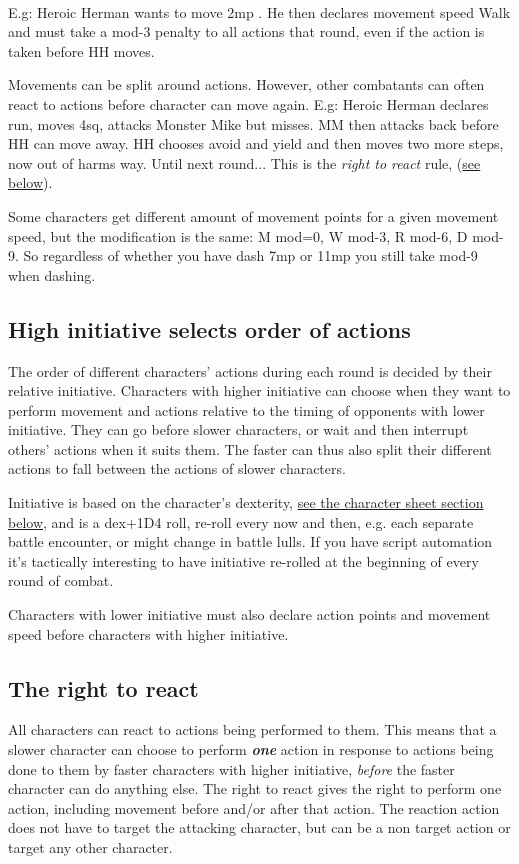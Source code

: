 \

E.g: Heroic Herman wants to move 2mp . He then declares movement speed Walk and must take a mod-3 penalty to all actions that round, even if the action is taken before HH moves.

Movements can be split around actions. However, other combatants can often react to actions before character can move again. E.g: Heroic Herman declares run, moves 4sq, attacks Monster Mike but misses. MM then attacks back before HH can move away. HH chooses avoid and yield and then moves two more steps, now out of harms way. Until next round... This is the \emph{right to react} rule, (\hyperref[righttoreact]{see below}).

Some characters get different amount of movement points for a given movement speed, but the modification is the same: M mod=0, W mod-3, R mod-6, D mod-9. So regardless of whether you have dash 7mp or 11mp you still take mod-9 when dashing.


\subsection*{High initiative selects order of actions}
The order of different characters' actions during each round is decided by their relative initiative. Characters with higher initiative can choose when they want to perform movement and actions relative to the timing of opponents with lower initiative. They can go before slower characters, or wait and then interrupt others' actions when it suits them. The faster can thus also split their different actions to fall between the actions of slower characters.

Initiative is based on the character's dexterity,
\hyperref[sec:charsheet]{see the character sheet section below},
and is a dex+1D4 roll, re-roll every now and then, e.g. each separate battle encounter, or might change in battle lulls. If you have script automation it's tactically interesting to have initiative re-rolled at the beginning of every round of combat.

Characters with lower initiative must also declare action points and movement speed before characters with higher initiative.


\subsection*{The right to react}
\label{righttoreact}
All characters can react to actions being performed to them. This means that a slower character can choose to perform \textit{\textbf{one}} action in response to actions being done to them by faster characters with higher initiative, \emph{before} the faster character can do anything else.
The right to react gives the right to perform one action, including movement before and/or after that action. The reaction action does not have to target the attacking character, but can be a non target action or target any other character.

